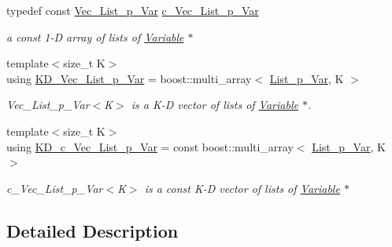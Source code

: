 \begin{DoxyCompactItemize}
typedef const \mbox{\hyperlink{group___variable___t_y_p_e_s_ga5c28c8956e72a58b668b86adad8c7805}{Vec\+\_\+\+List\+\_\+p\+\_\+\+Var}} \mbox{\hyperlink{group___variable___t_y_p_e_s_ga5419498ee46468a022e7234342622423}{c\+\_\+\+Vec\+\_\+\+List\+\_\+p\+\_\+\+Var}}
\begin{DoxyCompactList}\small\item\em a const 1-\/D array of lists of \mbox{\hyperlink{class_s_m_spp__di__unipi__it_1_1_variable}{Variable}} $\ast$ \end{DoxyCompactList}\item 
\mbox{\label{group___variable___t_y_p_e_s_gaf0ca613b1f488591d43c188ab5e94323}} 
{\footnotesize template$<$size\+\_\+t K$>$ }\\using \mbox{\hyperlink{group___variable___t_y_p_e_s_gaf0ca613b1f488591d43c188ab5e94323}{K\+D\+\_\+\+Vec\+\_\+\+List\+\_\+p\+\_\+\+Var}} = boost\+::multi\+\_\+array$<$ \mbox{\hyperlink{group___variable___t_y_p_e_s_ga1fccfcb7d57847e2b9ba2fa0c6100b80}{List\+\_\+p\+\_\+\+Var}}, K $>$
\begin{DoxyCompactList}\small\item\em Vec\+\_\+\+List\+\_\+p\+\_\+\+Var$<$\+K$>$ is a K-\/D vector of lists of \mbox{\hyperlink{class_s_m_spp__di__unipi__it_1_1_variable}{Variable}} $\ast$. \end{DoxyCompactList}\item 
\mbox{\label{group___variable___t_y_p_e_s_ga9d7332f91da35bffa8fb8a96b3c3702d}} 
{\footnotesize template$<$size\+\_\+t K$>$ }\\using \mbox{\hyperlink{group___variable___t_y_p_e_s_ga9d7332f91da35bffa8fb8a96b3c3702d}{K\+D\+\_\+c\+\_\+\+Vec\+\_\+\+List\+\_\+p\+\_\+\+Var}} = const boost\+::multi\+\_\+array$<$ \mbox{\hyperlink{group___variable___t_y_p_e_s_ga1fccfcb7d57847e2b9ba2fa0c6100b80}{List\+\_\+p\+\_\+\+Var}}, K $>$
\begin{DoxyCompactList}\small\item\em c\+\_\+\+Vec\+\_\+\+List\+\_\+p\+\_\+\+Var$<$\+K$>$ is a const K-\/D vector of lists of \mbox{\hyperlink{class_s_m_spp__di__unipi__it_1_1_variable}{Variable}} $\ast$ \end{DoxyCompactList}\end{DoxyCompactItemize}


\subsection{Detailed Description}
